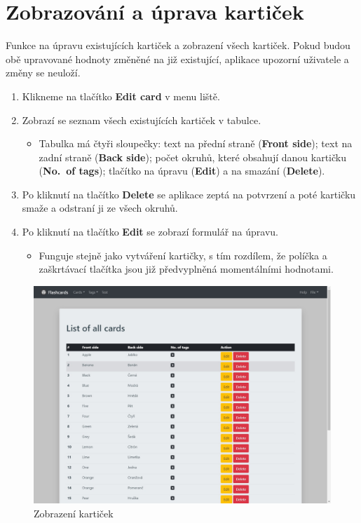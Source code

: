\documentclass[11pt]{article}
\providecommand{\tightlist}{\setlength{\itemsep}{1pt}\setlength{\parskip}{1pt}}
\begin{document}
\hypertarget{zobrazovuxe1nuxed-a-uxfaprava-kartiux10dek}{%
\section{Zobrazování a úprava
kartiček}\label{zobrazovuxe1nuxed-a-uxfaprava-kartiux10dek}}

Funkce na úpravu existujících kartiček a zobrazení všech kartiček. Pokud
budou obě upravované hodnoty změněné na již existující, aplikace
upozorní uživatele a změny se neuloží.

\begin{enumerate}
\def\labelenumi{\arabic{enumi}.}
\tightlist
\item
  Klikneme na tlačítko \textbf{Edit card} v menu liště.
\item
  Zobrazí se seznam všech existujících kartiček v tabulce.

  \begin{itemize}
  \tightlist
  \item
    Tabulka má čtyři sloupečky: text na přední straně (\textbf{Front
    side}); text na zadní straně (\textbf{Back side}); počet okruhů,
    které obsahují danou kartičku (\textbf{No.~of tags}); tlačítko na
    úpravu (\textbf{Edit}) a na smazání (\textbf{Delete}).
  \end{itemize}
\item
  Po kliknutí na tlačítko \textbf{Delete} se aplikace zeptá na potvrzení
  a poté kartičku smaže a odstraní ji ze všech okruhů.
\item
  Po kliknutí na tlačítko \textbf{Edit} se zobrazí formulář na úpravu.

  \begin{itemize}
  \tightlist
  \item
    Funguje stejně jako vytváření kartičky, s tím rozdílem, že políčka a
    zaškrtávací tlačítka jsou již předvyplněná momentálními hodnotami.
  \end{itemize}
\end{enumerate}

\begin{figure}
\centering
\includegraphics{../../../../assets/list_cards.jpg}
\caption{Zobrazení kartiček}
\end{figure}
\end{document}
